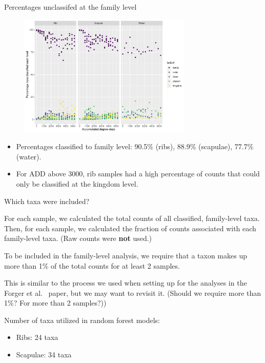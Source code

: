 \documentclass{beamer}
\begin{document}
\begin{frame}{Percentages unclassifed at the family level}

  \begin{center}
    \begin{figure}
      \includegraphics[width=3.25in]{family_perc_classif_by_add_type}
    \end{figure}
  \end{center}
  \vspace{-0.1in}
  {\footnotesize
  \begin{itemize}
    \item Percentages classified to family level: 90.5\% (ribs), 88.9\%
    (scapulae), 77.7\% (water).
    \item For ADD above 3000, rib samples had a high percentage of
  counts that could only be classified at the kingdom level.
  \end{itemize}
  }
\end{frame}



\begin{frame}{Which taxa were included?}

  \noindent For each sample, we calculated the total counts of all classified,
family-level taxa.  Then, for each sample, we calculated the fraction of counts
associated with each family-level taxa.  (Raw counts were \textbf{not} used.)

  \vspace{0.1in}

  \noindent To be included in the family-level analysis, we require that a taxon
  makes up more than 1\% of the total counts for at least 2 samples.

  \vspace{0.1in}

  \noindent This is similar to the process we used when setting up for the
analyses in the Forger et al.~ paper, but we may want to revisit it.  (Should we
require more than 1\%?  For more than 2 samples?))

  \vspace{0.1in}

  \noindent Number of taxa utilized in random forest models:
  \begin{itemize}
    \item Ribs: 24 taxa
    \item Scapulae: 34 taxa
  \end{itemize}


\end{frame}
\end{document}
